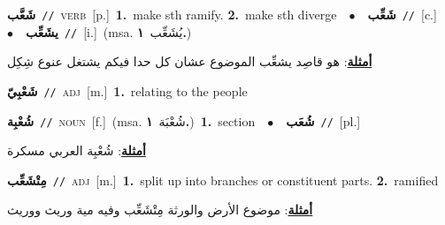 \documentclass[10pt,a4paper,twoside]{article} %
\begin{document}
\begin{multicols}{2}
{\setlength\topsep{0pt}\textbf{\foreignlanguage{arabic}{شَعَّب}}\ {\color{gray}\texttt{//}\color{black}}\ \textsc{verb}\ [p.]\ \textbf{1.}~make sth ramify.  \textbf{2.}~make sth diverge\ \ $\bullet$\ \ \setlength\topsep{0pt}\textbf{\foreignlanguage{arabic}{شَعِّب}}\ {\color{gray}\texttt{//}\color{black}}\ [c.]\ \ $\bullet$\ \ \setlength\topsep{0pt}\textbf{\foreignlanguage{arabic}{يشَعِّب}}\ {\color{gray}\texttt{//}\color{black}}\ [i.]\ \color{gray}(msa. \foreignlanguage{arabic}{يُشَعِّب}~\foreignlanguage{arabic}{\textbf{١.}})\color{black}\  \begin{flushright}\color{gray}\foreignlanguage{arabic}{\textbf{\underline{\foreignlanguage{arabic}{أمثلة}}}: هو قاصِد يشعِّب الموضوع عشان كل حدا فيكم يشتغل عنوع شِكِل}\end{flushright}\color{black}} \vspace{2mm}

{\setlength\topsep{0pt}\textbf{\foreignlanguage{arabic}{شَعْبِيّ}}\ {\color{gray}\texttt{//}\color{black}}\ \textsc{adj}\ [m.]\ \textbf{1.}~relating to the people\ } \vspace{2mm}

{\setlength\topsep{0pt}\textbf{\foreignlanguage{arabic}{شُعْبِة}}\ {\color{gray}\texttt{//}\color{black}}\ \textsc{noun}\ [f.]\ \color{gray}(msa. \foreignlanguage{arabic}{شُعْبَة}~\foreignlanguage{arabic}{\textbf{١.}})\color{black}\ \textbf{1.}~section\ \ $\bullet$\ \ \setlength\topsep{0pt}\textbf{\foreignlanguage{arabic}{شُعَب}}\ {\color{gray}\texttt{//}\color{black}}\ [pl.]\  \begin{flushright}\color{gray}\foreignlanguage{arabic}{\textbf{\underline{\foreignlanguage{arabic}{أمثلة}}}: شُعْبِة العربي مسكرة}\end{flushright}\color{black}} \vspace{2mm}

{\setlength\topsep{0pt}\textbf{\foreignlanguage{arabic}{مِتْشَعِّب}}\ {\color{gray}\texttt{//}\color{black}}\ \textsc{adj}\ [m.]\ \textbf{1.}~split up into branches or constituent parts.  \textbf{2.}~ramified\  \begin{flushright}\color{gray}\foreignlanguage{arabic}{\textbf{\underline{\foreignlanguage{arabic}{أمثلة}}}: موضوع الأرض والورثة مِتْشَعِّب وفيه مية وريث ووريث}\end{flushright}\color{black}} \vspace{2mm}


\end{multicols}
\end{document}
